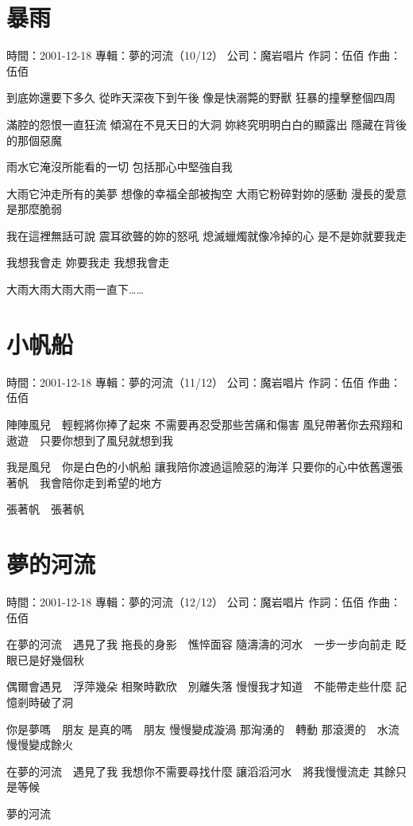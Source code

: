 \documentclass[UTF8,a4paper,oneside,twocolumn,12pt]{ctexbook}
\newcommand{\infopair}[2]{\textbullet #1：#2}
\newcommand{\zc}[1][伍佰]{\infopair{作詞}{#1}}
\newcommand{\zq}[1][伍佰]{\infopair{作曲}{#1}}
\newcommand{\zj}[1]{\infopair{專輯}{#1}}
\newcommand{\sj}[1]{\infopair{時間}{#1}}
\newcommand{\gs}[1]{\infopair{公司}{#1}}
\newenvironment{info}{\begin{flushleft}\kaishu
	}
	{\end{flushleft}\normalsize\yahei\par}
\newenvironment{lyric}{
	}
{}
\begin{document}
\section{暴雨}
\begin{info}
	\sj{2001-12-18}
	\zj{夢的河流（10/12）}
	\gs{魔岩唱片}
	\zc
	\zq
\end{info}
\begin{lyric}
	到底妳還要下多久
	從昨天深夜下到午後
	像是快溺斃的野獸
	狂暴的撞擊整個四周

	滿腔的怨恨一直狂流
	傾瀉在不見天日的大洞
	妳終究明明白白的顯露出
	隱藏在背後的那個惡魔

	雨水它淹沒所能看的一切
	包括那心中堅強自我

	大雨它沖走所有的美夢
	想像的幸福全部被掏空
	大雨它粉碎對妳的感動
	漫長的愛意是那麼脆弱

	我在這裡無話可說
	震耳欲聾的妳的怒吼
	熄滅蠟燭就像冷掉的心
	是不是妳就要我走

	我想我會走
	妳要我走
	我想我會走

	大雨大雨大雨大雨一直下……
\end{lyric}

\section{小帆船}
\begin{info}
	\sj{2001-12-18}
	\zj{夢的河流（11/12）}
	\gs{魔岩唱片}
	\zc
	\zq
\end{info}
\begin{lyric}
	陣陣風兒　輕輕將你捧了起來
	不需要再忍受那些苦痛和傷害
	風兒帶著你去飛翔和遨遊　只要你想到了風兒就想到我

	我是風兒　你是白色的小帆船
	讓我陪你渡過這險惡的海洋
	只要你的心中依舊還張著帆　我會陪你走到希望的地方

	張著帆　張著帆
\end{lyric}

\section{夢的河流}
\begin{info}
	\sj{2001-12-18}
	\zj{夢的河流（12/12）}
	\gs{魔岩唱片}
	\zc
	\zq
\end{info}
\begin{lyric}
	在夢的河流　遇見了我
	拖長的身影　憔悴面容
	隨濤濤的河水　一步一步向前走
	眨眼已是好幾個秋

	偶爾會遇見　浮萍幾朵
	相聚時歡欣　別離失落
	慢慢我才知道　不能帶走些什麼
	記憶剎時破了洞

	你是夢嗎　朋友
	是真的嗎　朋友
	慢慢變成漩渦
	那洶湧的　轉動
	那滾燙的　水流
	慢慢變成餘火

	在夢的河流　遇見了我
	我想你不需要尋找什麼
	讓滔滔河水　將我慢慢流走
	其餘只是等候

	夢的河流
\end{lyric}
\end{document}
